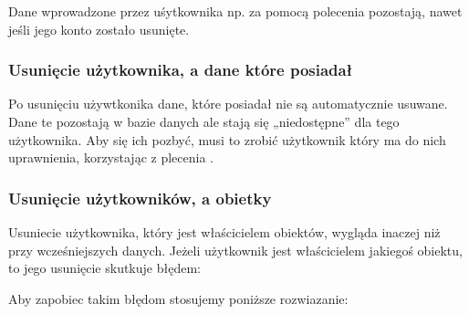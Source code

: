 \documentclass[letterpaper,10pt,polish]{sphinxmanual}
\begin{document}
\begin{sphinxVerbatim}[commandchars=\\\{\}]
  
\end{sphinxVerbatim}

\sphinxAtStartPar
Dane wprowadzone przez uśytkownika np. za pomocą polecenia  pozostają, nawet jeśli jego konto zostało usunięte.


\subsubsection{Usunięcie użytkownika, a dane które posiadał}
\label{\detokenize{rozdzial2/bezpieczenstwo/index:usuniecie-uzytkownika-a-dane-ktore-posiadal}}
\sphinxAtStartPar
Po usunięciu używtkonika dane, które posiadał nie są automatycznie usuwane. Dane te pozostają w bazie danych ale stają się „niedostępne” dla tego użytkownika. Aby się ich pozbyć, musi to zrobić użytkownik który ma do nich uprawnienia, korzystając z plecenia .


\subsubsection{Usunięcie użytkowników, a obietky}
\label{\detokenize{rozdzial2/bezpieczenstwo/index:usuniecie-uzytkownikow-a-obietky}}
\sphinxAtStartPar
Usuniecie użytkownika, który jest właścicielem obiektów, wygląda inaczej niż przy wcześniejszych danych. Jeżeli użytkownik jest właścicielem jakiegoś obiektu, to jego usunięcie skutkuje błędem:

\begin{sphinxVerbatim}[commandchars=\\\{\}]
           
\end{sphinxVerbatim}

\sphinxAtStartPar
Aby zapobiec takim błędom stosujemy poniższe rozwiazanie:

\begin{sphinxVerbatim}[commandchars=\\\{\}]
     
   
  
\end{sphinxVerbatim}
\end{document}
